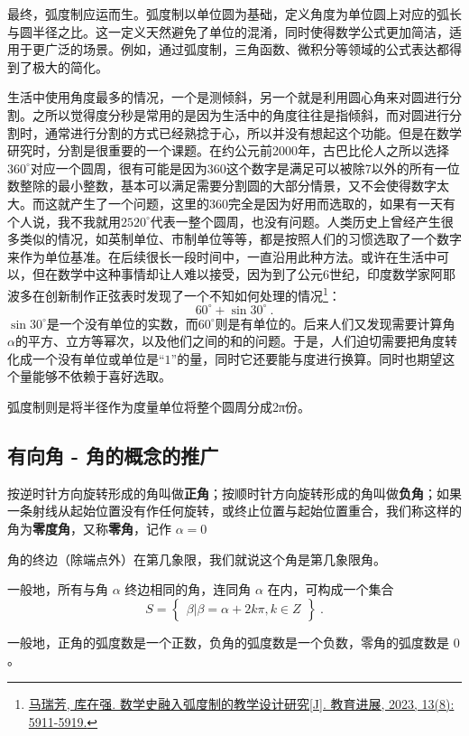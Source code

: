 最终，弧度制应运而生。弧度制以单位圆为基础，定义角度为单位圆上对应的弧长与圆半径之比。这一定义天然避免了单位的混淆，同时使得数学公式更加简洁，适用于更广泛的场景。例如，通过弧度制，三角函数、微积分等领域的公式表达都得到了极大的简化。


生活中使用角度最多的情况，一个是测倾斜，另一个就是利用圆心角来对圆进行分割。之所以觉得度分秒是常用的是因为生活中的角度往往是指倾斜，而对圆进行分割时，通常进行分割的方式已经熟捻于心，所以并没有想起这个功能。但是在数学研究时，分割是很重要的一个课题。在约公元前2000年，古巴比伦人之所以选择$360^\circ$对应一个圆周，很有可能是因为360这个数字是满足可以被除7以外的所有一位数整除的最小整数，基本可以满足需要分割圆的大部分情景，又不会使得数字太大。而这就产生了一个问题，这里的360完全是因为好用而选取的，如果有一天有个人说，我不我就用$2520^\circ$代表一整个圆周，也没有问题。人类历史上曾经产生很多类似的情况，如英制单位、市制单位等等，都是按照人们的习惯选取了一个数字来作为单位基准。在后续很长一段时间中，一直沿用此种方法。或许在生活中可以，但在数学中这种事情却让人难以接受，因为到了公元6世纪，印度数学家阿耶波多在创新制作正弦表时发现了一个不知如何处理的情况\footnote{\href{https://www.hanspub.org/journal/PaperInformation?paperID=71063&utm_source=chatgpt.com}{马瑞芳, 库在强. 数学史融入弧度制的教学设计研究[J]. 教育进展, 2023, 13(8): 5911-5919.}}：
\begin{equation}
60^\circ+\sin30^\circ~.
\end{equation}
$\sin30^\circ$是一个没有单位的实数，而$60^\circ$则是有单位的。后来人们又发现需要计算角$\alpha$的平方、立方等幂次，以及他们之间的和的问题。于是，人们迫切需要把角度转化成一个没有单位或单位是“$1$”的量，同时它还要能与度进行换算。同时也期望这个量能够不依赖于喜好选取。

弧度制则是将半径作为度量单位将整个圆周分成2π份。

\subsection{有向角 - 角的概念的推广}


按逆时针方向旋转形成的角叫做\textbf{正角}；按顺时针方向旋转形成的角叫做\textbf{负角}；如果一条射线从起始位置没有作任何旋转，或终止位置与起始位置重合，我们称这样的角为\textbf{零度角}，又称\textbf{零角}，记作 $\alpha = 0$

角的终边（除端点外）在第几象限，我们就说这个角是第几象限角。

一般地，所有与角 $\alpha$ 终边相同的角，连同角 $\alpha$ 在内，可构成一个集合
\begin{equation}
S = \begin{Bmatrix} \beta|\beta=\alpha+2k\pi,k \in Z \end{Bmatrix}~.
\end{equation}


一般地，正角的弧度数是一个正数，负角的弧度数是一个负数，零角的弧度数是 $0$。

